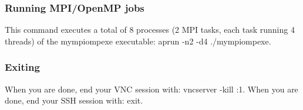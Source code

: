 \documentclass[a4paper,pagesize,12pt]{scrbook}
\begin{document}
\subsubsection*{Running MPI/OpenMP jobs}
This command executes a total of 8 processes (2 MPI tasks, each task running 4 threads) of the mympiompexe executable:
\colorbox{mycolor}{aprun -n2 -d4 ./mympiompexe}.\\

\subsubsection*{Exiting}
When you are done, end your VNC session with: \colorbox{mycolor}{vncserver -kill :1}.
When you are done, end your SSH session with: \colorbox{mycolor}{exit}.



% 			


% 
% 
% 	

\newpage


\end{document}
